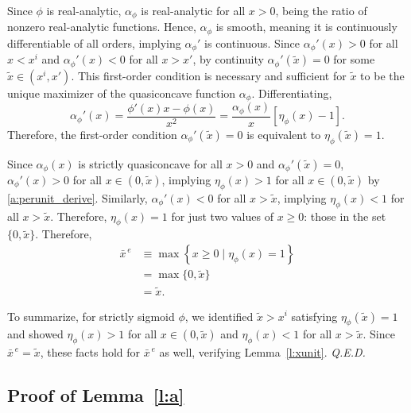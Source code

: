 \documentclass[12pt]{article}
\renewcommand{\qed}{{\it Q.E.D.}}
\newcommand{\efficacy}{\phi}
\newcommand{\xunitbar}{\bar{x}^{\,e}}
\newcommand{\xpoi}{x^{i}}
\newcommand{\elasticity}[1]{\eta_{#1}}
\newcommand{\perunit}[1]{\alpha_{#1}}
\newcommand{\xtilde}{\tilde{x}}
\begin{document}
Since $\efficacy$ is real-analytic, $\perunit{\efficacy}$ is
real-analytic for all $x >0$, being the ratio of nonzero real-analytic
functions. Hence, $\perunit{\efficacy}$ is smooth, meaning it is
continuously differentiable of all orders, implying
$\perunit{\efficacy}'$ is continuous. Since $\perunit{\efficacy}'\!(x)
> 0$ for all $x < \xpoi$ and $\perunit{\efficacy}'\!(x) < 0$ for all
$x > x'$, by continuity $\perunit{\efficacy}'\!(\xtilde) = 0$ for some
$\xtilde \in (\xpoi, x')$. This first-order condition is necessary and
sufficient for $\xtilde$ to be the unique maximizer of the
quasiconcave function $\perunit{\efficacy}$. Differentiating,
\begin{equation}
\label{a:perunit_derive}
\perunit{\efficacy}'\!(x) = \frac{\efficacy'(x) x - \efficacy(x)}{x^2}
= \frac{\perunit{\efficacy}\!(x)}{x} [ \elasticity{\efficacy}\!(x) -
  1].
\end{equation}
Therefore, the first-order condition $\perunit{\efficacy}'\!(\xtilde)
= 0$ is equivalent to $\elasticity{\efficacy}\!(\xtilde) = 1$.

Since $\perunit{\efficacy}\!(x)$ is strictly quasiconcave for all $x >
0$ and $\perunit{\efficacy}'\!(\xtilde) = 0$,
$\perunit{\efficacy}'\!(x) > 0$ for all $x \in (0, \xtilde)$, implying
$\elasticity{\efficacy}\!(x) > 1$ for all $x \in (0, \xtilde)$ by
\eqref{a:perunit_derive}. Similarly, $\perunit{\efficacy}'\!(x) < 0$
for all $x > \xtilde$, implying $\elasticity{\efficacy}\!(x) < 1$ for
all $x > \xtilde$. Therefore, $\elasticity{\efficacy}\!(x) = 1$ for
just two values of $x \geq 0$: those in the set $\{0,
\xtilde\}$. Therefore,
\begin{align}
\xunitbar & \equiv \max \left\{ x \geq 0 \mid \elasticity{\efficacy}\!(x) = 1 \right\} \label{a:xunit1} \\
& = \max \{0, \xtilde \} \label{a:xunit2} \\
& = \xtilde.
\end{align}

To summarize, for strictly sigmoid $\efficacy$, we identified $\xtilde
> \xpoi$ satisfying $\elasticity{\efficacy}\!(\xtilde) = 1$ and showed
$\elasticity{\efficacy}\!(x) > 1$ for all $x \in (0, \xtilde)$ and
$\elasticity{\efficacy}\!(x) < 1$ for all $x > \xtilde$. Since
$\xunitbar = \xtilde$, these facts hold for $\xunitbar$ as well,
verifying Lemma~\ref{l:xunit}. \qed


\subsection*{Proof of Lemma~\ref{l:a}}
\end{document}
